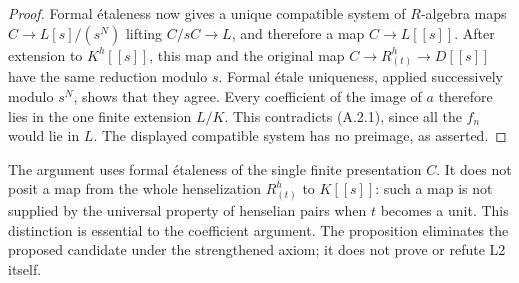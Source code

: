 \begin{proof}
Formal \'etaleness now gives a unique compatible system of
$R$-algebra maps $C\to L[s]/(s^N)$ lifting $C/sC\to L$,
and therefore a map $C\to L[[s]]$.
After extension to $K^h[[s]]$, this map and the original map
$C\to R^h_{(t)}\to D[[s]]$ have the same reduction modulo $s$.
Formal \'etale uniqueness, applied successively modulo $s^N$,
shows that they agree. Every coefficient of the image of $a$
therefore lies in the one finite extension $L/K$. This contradicts
(A.2.1), since all the $f_n$ would lie in $L$.
The displayed compatible system has no preimage, as asserted.
\end{proof}

The argument uses formal \'etaleness of the single finite
presentation $C$. It does not posit a map from the whole
henselization $R^h_{(t)}$ to $K[[s]]$: such a map is not supplied
by the universal property of henselian pairs when $t$ becomes a
unit. This distinction is essential to the coefficient argument.
The proposition eliminates the proposed candidate under the
strengthened axiom; it does not prove or refute L2 itself.
